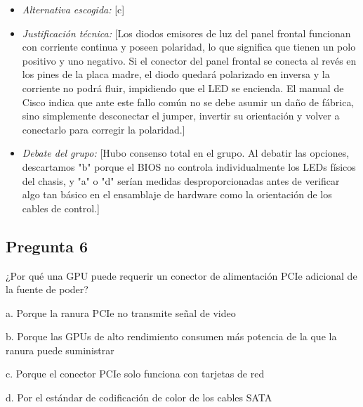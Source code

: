 \documentclass{article}
\begin{document}
\begin{itemize}
\item \emph{Alternativa escogida:} [c]

\item \emph{Justificación técnica:} [Los diodos emisores de luz del panel
frontal funcionan con corriente continua y poseen polaridad, lo que
significa que tienen un polo positivo y uno negativo. Si el conector
del panel frontal se conecta al revés en los pines de la placa
madre, el diodo quedará polarizado en inversa y la corriente no
podrá fluir, impidiendo que el LED se encienda. El manual de Cisco
indica que ante este fallo común no se debe asumir un daño de
fábrica, sino simplemente desconectar el jumper, invertir su
orientación y volver a conectarlo para corregir
la polaridad.]

\item \emph{Debate del grupo:} [Hubo consenso total en el grupo. Al debatir las
opciones, descartamos "b" porque el BIOS no controla individualmente
los LEDs físicos del chasis, y "a" o "d" serían medidas
desproporcionadas antes de verificar algo tan básico en el
ensamblaje de hardware como la orientación de los cables de
control.]
\end{itemize}

\subsection{Pregunta 6}
\label{sec:org5f2c660}
¿Por qué una GPU puede requerir un conector de alimentación PCIe adicional de la fuente de poder?

a. Porque la ranura PCIe no transmite señal de video

b. Porque las GPUs de alto rendimiento consumen más potencia de la que la ranura puede suministrar

c. Porque el conector PCIe solo funciona con tarjetas de red

d. Por el estándar de codificación de color de los cables SATA
\end{document}
